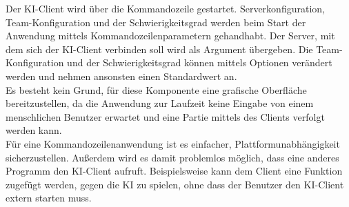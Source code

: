 Der KI-Client wird über die Kommandozeile gestartet. Serverkonfiguration, Team-Konfiguration und der Schwierigkeitsgrad werden beim Start der Anwendung mittels Kommandozeilenparametern gehandhabt. Der Server, mit dem sich der KI-Client verbinden soll wird als Argument übergeben. Die Team-Konfiguration und der Schwierigkeitsgrad können mittels Optionen verändert werden und nehmen ansonsten einen Standardwert an.\\
Es besteht kein Grund, für diese Komponente eine grafische Oberfläche bereitzustellen, da die Anwendung zur Laufzeit keine Eingabe von einem menschlichen Benutzer erwartet und eine Partie mittels des Clients verfolgt werden kann. \\
Für eine Kommandozeilenanwendung ist es einfacher, Plattformunabhängigkeit sicherzustellen. Außerdem wird es damit problemlos möglich, dass eine anderes Programm den KI-Client aufruft. Beispielsweise kann dem Client eine Funktion zugefügt werden, gegen die KI zu spielen, ohne dass der Benutzer den KI-Client extern starten muss.